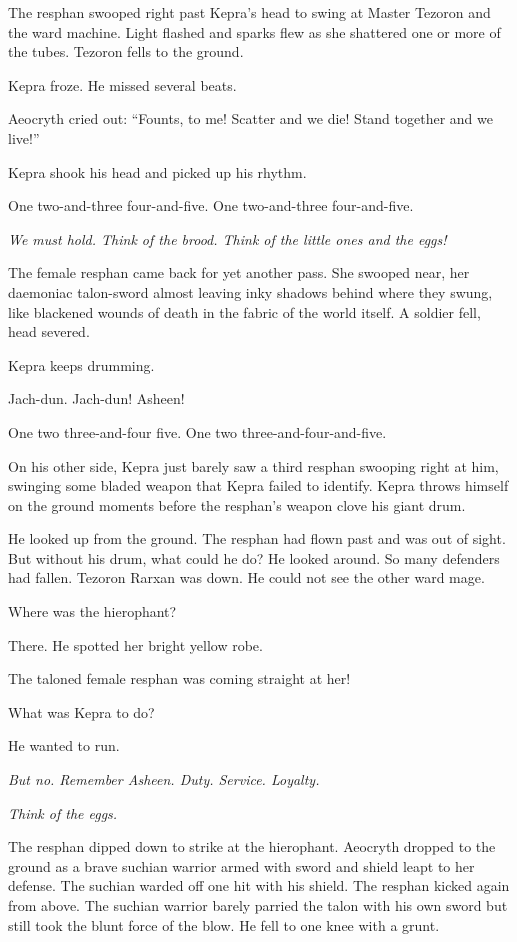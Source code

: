 \documentclass
  [a4paper,
   12pt,
   oneside
  ]%
  {article}
\begin{document}
The resphan swooped right past Kepra’s head to swing at Master Tezoron and the ward machine. 
Light flashed and sparks flew as she shattered one or more of the tubes. 
Tezoron fells to the ground. 

Kepra froze. He missed several beats. 

Aeocryth cried out: 
``Founts, to me! Scatter and we die! Stand together and we live!'' 

Kepra shook his head and picked up his rhythm. 

One two-and-three four-and-five. One two-and-three four-and-five.

\emph{We must hold. Think of the brood. Think of the little ones and the eggs!}

The female resphan came back for yet another pass. She swooped near, her daemoniac talon-sword almost leaving inky shadows behind where they swung, like blackened wounds of death in the fabric of the world itself. 
A soldier fell, head severed. 

Kepra keeps drumming. 

Jach-dun. Jach-dun! Asheen!

One two three-and-four five. One two three-and-four-and-five.

On his other side, Kepra just barely saw a third resphan swooping right at him, swinging some bladed weapon that Kepra failed to identify. Kepra throws himself on the ground moments before the resphan's weapon clove his giant drum. 

He looked up from the ground. 
The resphan had flown past and was out of sight. 
But without his drum, what could he do? 
He looked around. So many defenders had fallen. Tezoron Rarxan was down. He could not see the other ward mage. 

Where was the hierophant? 

There. He spotted her bright yellow robe. 

The taloned female resphan was coming straight at her! 

What was Kepra to do? 

He wanted to run. 

\emph{But no. Remember Asheen. Duty. Service. Loyalty. }

\emph{Think of the eggs.}

The resphan dipped down to strike at the hierophant. 
Aeocryth dropped to the ground as a brave suchian warrior armed with sword and shield leapt to her defense. 
The suchian warded off one hit with his shield. 
The resphan kicked again from above. 
The suchian warrior barely parried the talon with his own sword but still took the blunt force of the blow. 
He fell to one knee with a grunt. 
\end{document}
